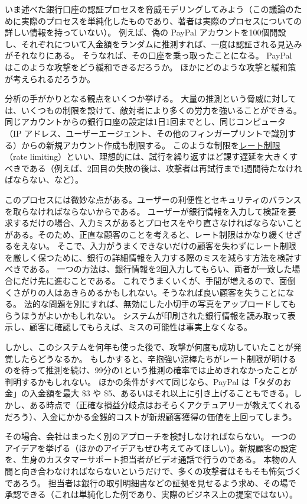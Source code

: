 \documentclass[uplatex]{jsarticle}
\def\label#1{}%
\begin{document}
\begin{exa}\label{exa:ch2-paypal-threat-model}
いま述べた銀行口座の認証プロセスを脅威モデリングしてみよう（この議論のために実際のプロセスを単純化したものであり、著者は実際のプロセスについての詳しい情報を持っていない）。
例えば、偽の PayPal アカウントを100個開設し、それぞれについて入金額をランダムに推測すれば、一度は認証される見込みがそれなりにある。
そうなれば、その口座を乗っ取ったことになる。
PayPal はこのような攻撃をどう緩和できるだろうか。
ほかにどのような攻撃と緩和策が考えられるだろうか。

分析の手がかりとなる観点をいくつか挙げる。
大量の推測という脅威に対しては、いくつもの制限を設けて、敵対者により多くの労力を強いることができる。
同じアカウントからの銀行口座の設定は1日1回までとし、同じコンピュータ（IP アドレス、ユーザーエージェント、その他のフィンガープリントで識別する）からの新規アカウント作成も制限する。
このような制限を\underline{レート制限}（rate limiting）といい、理想的には、試行を繰り返すほど課す遅延を大きくすべきである（例えば、2回目の失敗の後は、攻撃者は再試行まで1週間待たなければならない、など）。

このプロセスには微妙な点がある。ユーザーの利便性とセキュリティのバランスを取らなければならないからである。
ユーザーが銀行情報を入力して検証を要求するだけの場合、入力ミスがあるとプロセスをやり直さなければならないことがある。そのため、正直な顧客のことを考えると、レート制限はかなり緩くせざるをえない。
そこで、入力がうまくできないだけの顧客を失わずにレート制限を厳しく保つために、銀行の詳細情報を入力する際のミスを減らす方法を検討すべきである。
一つの方法は、銀行情報を2回入力してもらい、両者が一致した場合にだけ先に進むことである。
これでうまくいくが、手間が増えるので、面倒くさがりの人はあきらめるかもしれない。そうなれば良い顧客を失うことになる。
法的な問題を別にすれば、無効にした小切手の写真をアップロードしてもらうほうがよいかもしれない。
システムが印刷された銀行情報を読み取って表示し、顧客に確認してもらえば、ミスの可能性は事実上なくなる。

しかし、このシステムを何年も使った後で、攻撃が何度も成功していたことが発覚したらどうなるか。
もしかすると、辛抱強い泥棒たちがレート制限が明けるのを待って推測を続け、99分の1という推測の確率では止めきれなかったことが判明するかもしれない。
ほかの条件がすべて同じなら、PayPal は「タダのお金」の入金額を最大 \$3 や \$5、あるいはそれ以上に引き上げることもできる。しかし、ある時点で（正確な損益分岐点はおそらくアクチュアリーが教えてくれるだろう）、入金にかかる金銭的コストが新規顧客獲得の価値を上回ってしまう。

その場合、会社はまったく別のアプローチを検討しなければならない。
一つのアイデアを挙げる（ほかのアイデアもぜひ考えてみてほしい）。新規顧客の設定を、生身のカスタマーサポート担当者がビデオ通話で行うのである。
本物の人間と向き合わなければならないというだけで、多くの攻撃者はそもそも怖気づくであろう。
担当者は銀行の取引明細書などの証拠を見せるよう求め、その場で承認できる（これは単純化した例であり、実際のビジネス上の提案ではない）。
\end{exa}
\end{document}
